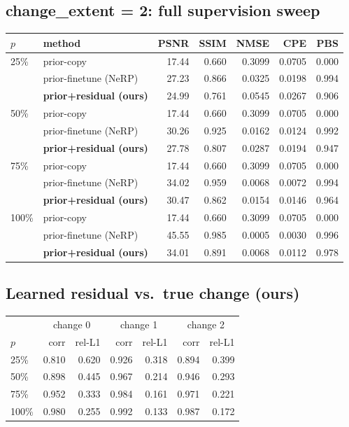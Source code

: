\documentclass[11pt]{article}
\begin{document}
\subsection*{change\_extent = 2: full supervision sweep}
\begin{table}[H]\centering\begin{tabular}{llrrrrr}\toprule
$p$ & method & PSNR & SSIM & NMSE & CPE & PBS \\ \midrule
25\% & prior-copy & 17.44 & 0.660 & 0.3099 & 0.0705 & 0.000 \\
 & prior-finetune (NeRP) & 27.23 & 0.866 & 0.0325 & 0.0198 & 0.994 \\
 & \textbf{prior+residual (ours)} & 24.99 & 0.761 & 0.0545 & 0.0267 & 0.906 \\
\midrule
50\% & prior-copy & 17.44 & 0.660 & 0.3099 & 0.0705 & 0.000 \\
 & prior-finetune (NeRP) & 30.26 & 0.925 & 0.0162 & 0.0124 & 0.992 \\
 & \textbf{prior+residual (ours)} & 27.78 & 0.807 & 0.0287 & 0.0194 & 0.947 \\
\midrule
75\% & prior-copy & 17.44 & 0.660 & 0.3099 & 0.0705 & 0.000 \\
 & prior-finetune (NeRP) & 34.02 & 0.959 & 0.0068 & 0.0072 & 0.994 \\
 & \textbf{prior+residual (ours)} & 30.47 & 0.862 & 0.0154 & 0.0146 & 0.964 \\
\midrule
100\% & prior-copy & 17.44 & 0.660 & 0.3099 & 0.0705 & 0.000 \\
 & prior-finetune (NeRP) & 45.55 & 0.985 & 0.0005 & 0.0030 & 0.996 \\
 & \textbf{prior+residual (ours)} & 34.01 & 0.891 & 0.0068 & 0.0112 & 0.978 \\

\bottomrule\end{tabular}
\end{table}
\subsection*{Learned residual vs.\ true change (ours)}
\begin{table}[H]\centering\begin{tabular}{lrrrrrr}\toprule
 & \multicolumn{2}{c}{change 0} & \multicolumn{2}{c}{change 1} & \multicolumn{2}{c}{change 2} \\
$p$ & corr & rel-L1 & corr & rel-L1 & corr & rel-L1 \\ \midrule
25\% & 0.810 & 0.620 & 0.926 & 0.318 & 0.894 & 0.399 \\
50\% & 0.898 & 0.445 & 0.967 & 0.214 & 0.946 & 0.293 \\
75\% & 0.952 & 0.333 & 0.984 & 0.161 & 0.971 & 0.221 \\
100\% & 0.980 & 0.255 & 0.992 & 0.133 & 0.987 & 0.172 \\
\bottomrule\end{tabular}\end{table}
\end{document}
